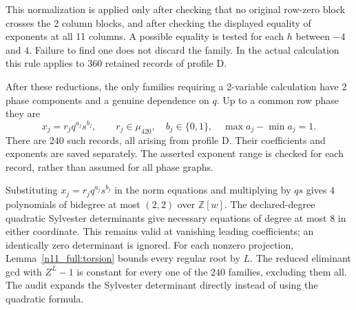 \documentclass[11pt,a4paper]{article}
\theoremstyle{plain}
\theoremstyle{definition}
\theoremstyle{plain}
\begin{document}
This normalization is applied only after checking that no original row-zero block crosses the 2 column blocks, and after checking the displayed equality of exponents at all 11 columns. A possible equality is tested for each $h$ between $-4$ and $4$. Failure to find one does not discard the family. In the actual calculation this rule applies to $360$ retained records of profile $\mathrm{D}$.

After these reductions, the only families requiring a 2-variable calculation have 2 phase components and a genuine dependence on $q$. Up to a common row phase they are
\[
x_j=r_jq^{a_j}s^{b_j},\qquad r_j\in\mu_{420},\quad b_j\in\{0,1\},\quad
\max a_j-\min a_j=1.
\]
There are $240$ such records, all arising from profile $\mathrm{D}$. Their coefficients and exponents are saved separately. The asserted exponent range is checked for each record, rather than assumed for all phase graphs.

\medskip
Substituting $x_j=r_jq^{a_j}s^{b_j}$ in the norm equations and multiplying by $qs$ gives $4$ polynomials of bidegree at most $(2,2)$ over $\mathbb Z[w]$. The declared-degree quadratic Sylvester determinants give necessary equations of degree at most $8$ in either coordinate. This remains valid at vanishing leading coefficients; an identically zero determinant is ignored. For each nonzero projection, Lemma~\ref{n11_full:torsion} bounds every regular root by $L$. The reduced eliminant gcd with $Z^L-1$ is constant for every one of the $240$ families, excluding them all. The audit expands the Sylvester determinant directly instead of using the quadratic formula.
\end{document}
